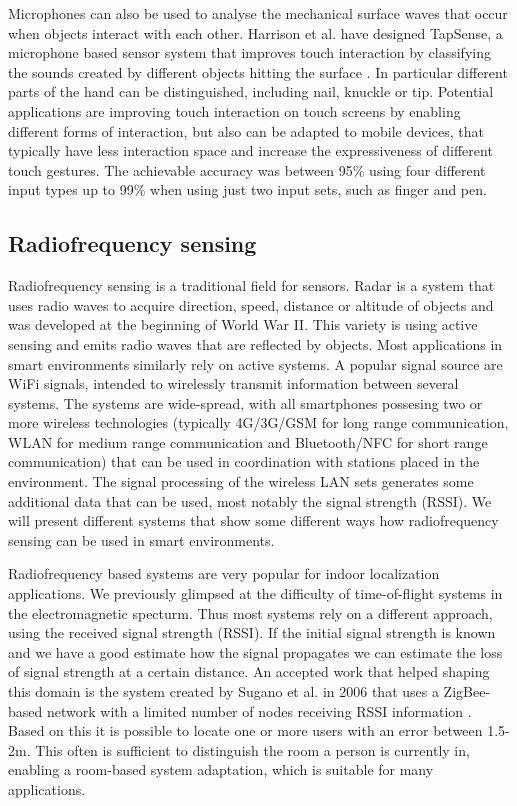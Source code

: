 Microphones can also be used to analyse the mechanical surface waves that occur when objects interact with each other. Harrison et al. have designed TapSense, a microphone based sensor system that improves touch interaction by classifying the sounds created by different objects hitting the surface \cite{harrison2011tapsense}. In particular different parts of the hand can be distinguished, including nail, knuckle or tip. Potential applications are improving touch interaction on touch screens by enabling different forms of interaction, but also can be adapted to mobile devices, that typically have less interaction space and increase the expressiveness of different touch gestures. The achievable accuracy was between 95\% using four different input types up to 99\% when using just two input sets, such as finger and pen.

\subsection{Radiofrequency sensing}
Radiofrequency sensing is a traditional field for sensors. Radar is a system that uses radio waves to acquire direction, speed, distance or altitude of objects and was developed at the beginning of World War II. This variety is using active sensing and emits radio waves that are reflected by objects. Most applications in smart environments similarly rely on active systems. A popular signal source are WiFi signals, intended to wirelessly transmit information between several systems. The systems are wide-spread, with all smartphones possesing two or more wireless technologies (typically 4G/3G/GSM for long range communication, WLAN for medium range communication and Bluetooth/NFC for short range communication) that can be used in coordination with stations placed in the environment. The signal processing of the wireless LAN sets generates some additional data that can be used, most notably the signal strength (RSSI). We will present different systems that show some different ways how radiofrequency sensing can be used in smart environments.

Radiofrequency based systems are very popular for indoor localization applications. We previously glimpsed at the difficulty of time-of-flight systems in the electromagnetic specturm. Thus most systems rely on a different approach, using the received signal strength (RSSI). If the initial signal strength is known and we have a good estimate how the signal propagates we can estimate the loss of signal strength at a certain distance. An accepted work that helped shaping this domain is the system created by Sugano et al. in 2006 that uses a ZigBee-based network with a limited number of nodes receiving RSSI information \cite{sugano2006indoor}. Based on this it is possible to locate one or more users with an error between 1.5-2m. This often is sufficient to distinguish the room a person is currently in, enabling a room-based system adaptation, which is suitable for many applications.

